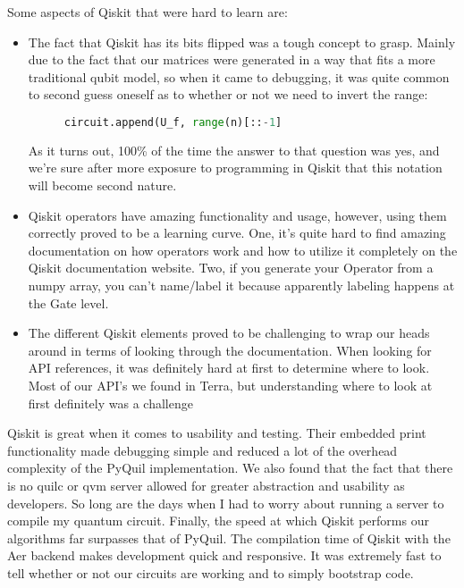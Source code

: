 \documentclass[12pt]{article}
\begin{document}
Some aspects of Qiskit that were hard to learn are:
\begin{itemize}
    \item The fact that Qiskit has its bits flipped was a tough concept to grasp. Mainly due to the fact that our matrices were generated in a way that fits a more traditional qubit model, so when it came to debugging, it was quite common to second guess oneself as to whether or not we need to invert the range:
\begin{figure}[h]
    \centering
    \begin{lstlisting}[numbers=none, language=Python]
    circuit.append(U_f, range(n)[::-1]
\end{lstlisting}
\end{figure}
As it turns out, 100\% of the time the answer to that question was yes, and we’re sure after more exposure to programming in Qiskit that this notation will become second nature.
    \item Qiskit operators have amazing functionality and usage, however, using them correctly proved to be a learning curve. One, it’s quite hard to find amazing documentation on how operators work and how to utilize it completely on the Qiskit documentation website. Two, if you generate your Operator from a numpy array, you can’t name/label it because apparently labeling happens at the Gate level. 
    \item The different Qiskit elements proved to be challenging to wrap our heads around in terms of looking through the documentation. When looking for API references, it was definitely hard at first to determine where to look. Most of our API’s we found in Terra, but understanding where to look at first definitely was a challenge
\end{itemize}

Qiskit is great when it comes to usability and testing. Their embedded print functionality made debugging simple and reduced a lot of the overhead complexity of the PyQuil implementation. We also found that the fact that there is no quilc or qvm server allowed for greater abstraction and usability as developers. So long are the days when I had to worry about running a server to compile my quantum circuit. Finally, the speed at which Qiskit performs our algorithms far surpasses that of PyQuil. The compilation time of Qiskit with the Aer backend makes development quick and responsive. It was extremely fast to tell whether or not our circuits are working and to simply bootstrap code.
\end{document}

